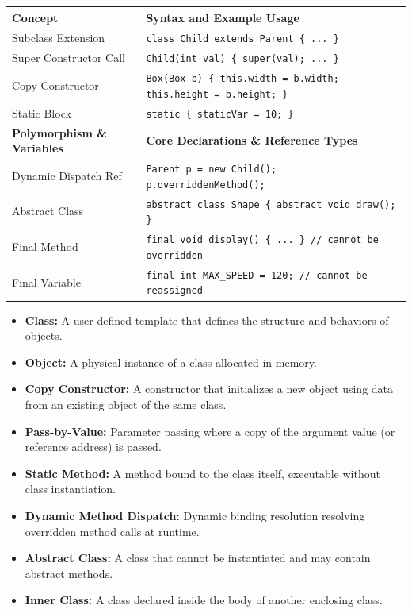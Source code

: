 \documentclass[12pt,a4paper]{article}
\renewcommand{\arraystretch}{1.45}
\begin{document}
\begin{tcolorbox}[formulabox, title={\textbf{Class, Constructor \& Inheritance Syntax}}]
{\renewcommand{\arraystretch}{1.3}%
\begin{tabularx}{\linewidth}{l Y}
\textbf{Concept} & \textbf{Syntax and Example Usage} \\
\hline
Subclass Extension & \texttt{class Child extends Parent \{ ... \}} \\
Super Constructor Call & \texttt{Child(int val) \{ super(val); ... \}} \\
Copy Constructor & \texttt{Box(Box b) \{ this.width = b.width; this.height = b.height; \}} \\
Static Block & \texttt{static \{ staticVar = 10; \}} \\
\hline
\textbf{Polymorphism \& Variables} & \textbf{Core Declarations \& Reference Types} \\
\hline
Dynamic Dispatch Ref & \texttt{Parent p = new Child(); p.overriddenMethod();} \\
Abstract Class & \texttt{abstract class Shape \{ abstract void draw(); \}} \\
Final Method & \texttt{final void display() \{ ... \} // cannot be overridden} \\
Final Variable & \texttt{final int MAX\_SPEED = 120; // cannot be reassigned} \\
\end{tabularx}}
\end{tcolorbox}

\begin{tcolorbox}[defbox, title={\textbf{One-Line Definitions}}]
\begin{itemize}[leftmargin=*, itemsep=2pt]
  \item \textbf{Class:} A user-defined template that defines the structure and behaviors of objects.
  \item \textbf{Object:} A physical instance of a class allocated in memory.
  \item \textbf{Copy Constructor:} A constructor that initializes a new object using data from an existing object of the same class.
  \item \textbf{Pass-by-Value:} Parameter passing where a copy of the argument value (or reference address) is passed.
  \item \textbf{Static Method:} A method bound to the class itself, executable without class instantiation.
  \item \textbf{Dynamic Method Dispatch:} Dynamic binding resolution resolving overridden method calls at runtime.
  \item \textbf{Abstract Class:} A class that cannot be instantiated and may contain abstract methods.
  \item \textbf{Inner Class:} A class declared inside the body of another enclosing class.
\end{itemize}
\end{tcolorbox}
\end{document}
